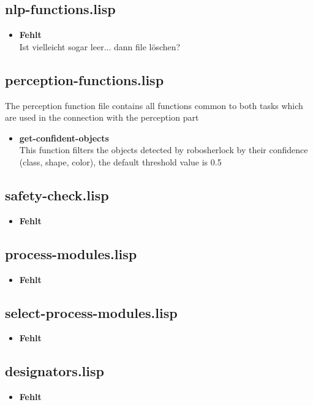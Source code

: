 \documentclass[main.tex]{subfiles}
\begin{document}
	    \subsection{nlp-functions.lisp}
	    \begin{itemize}
	    	\item \textbf{Fehlt} \\
	    	Ist vielleicht sogar leer... dann file löschen?
	    \end{itemize}
	    \subsection{perception-functions.lisp}
	    The perception function file contains all functions common to both tasks which are used in the connection with the perception part
	    \begin{itemize}
	    	\item \textbf{get-confident-objects} \\
	    	This function filters the objects detected by robosherlock by their confidence (class, shape, color), the default threshold value is 0.5
	    \end{itemize}
	    \subsection{safety-check.lisp}
	    \begin{itemize}
	    	\item \textbf{Fehlt} \\
	    \end{itemize}
	    \subsection{process-modules.lisp}
	    \begin{itemize}
	    	\item \textbf{Fehlt} \\
	    \end{itemize}
	    \subsection{select-process-modules.lisp}
	    \begin{itemize}
	    	\item \textbf{Fehlt} \\
	    \end{itemize}
	    \subsection{designators.lisp}
	    \begin{itemize}
	    	\item \textbf{Fehlt} \\
	    \end{itemize}
\end{document}
